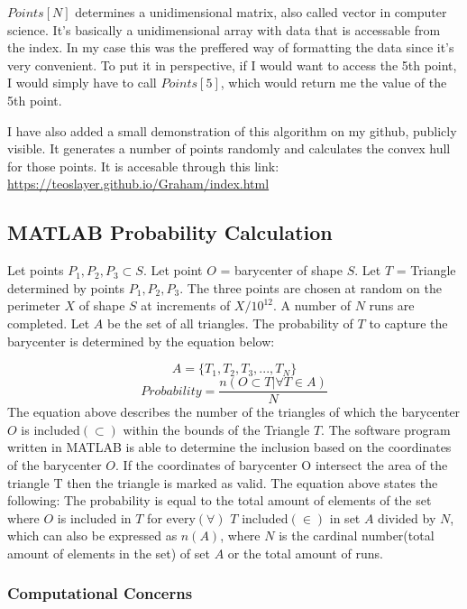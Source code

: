 \documentclass[9pt,onecolumn,oneside]{osajnl}
\begin{document}
	\(Points[N]\) determines a unidimensional matrix, also called vector in computer science. It's basically a unidimensional array with data that is accessable from the index. In my case this was the preffered way of formatting the data since it's very convenient. To put it in perspective, if I would want to access the 5th point,  I would simply have to call \(Points[5]\), which would return me the value of the 5th point.
    
    I have also added a small demonstration of this algorithm on my github, publicly visible. It generates a number of points randomly and calculates the convex hull for those points. It is accesable through this link: \url{https://teoslayer.github.io/Graham/index.html}



\subsection{MATLAB Probability Calculation}

	Let points \(P_{1}, P_{2}, P_{3} \subset S\). Let point \(O\) = barycenter of shape \(S\). Let \(T\) = Triangle determined by points \(P_{1}, P_{2}, P_{3}\). The three points are chosen at random on the perimeter \(X\) of shape \(S\) at increments of \(X/{10^{12}}\). A number of \(N\) runs are completed. Let \(A\) be the set of all triangles. The probability of  \(T\) to capture the barycenter is determined by the equation below:

\[A = \{T_{1}, T_{2}, T_{3}, ..., T_{N}\}\]
\[Probability = \frac{n(O \subset T |   \forall T  \in A)}{N}\]
	The equation above describes the number of the triangles of which the barycenter \(O\) is included\((\subset )\) within the bounds of the Triangle \(T\). The software program written in MATLAB is able to determine the inclusion based on the coordinates of the barycenter \(O\). If the coordinates of barycenter O intersect the area of the triangle T then the triangle is marked as valid. The equation above states the following:
The probability is equal to the total amount of elements of the set where \(O\) is included in \(T\) for every\((\forall )\) \(T\) included\((\in)\) in set \(A\) divided by \(N\), which can also be expressed as \(n(A)\), where \(N\) is the cardinal number(total amount of elements in the set) of set \(A\) or the total amount of runs.

\subsubsection{Computational Concerns}
\end{document}
